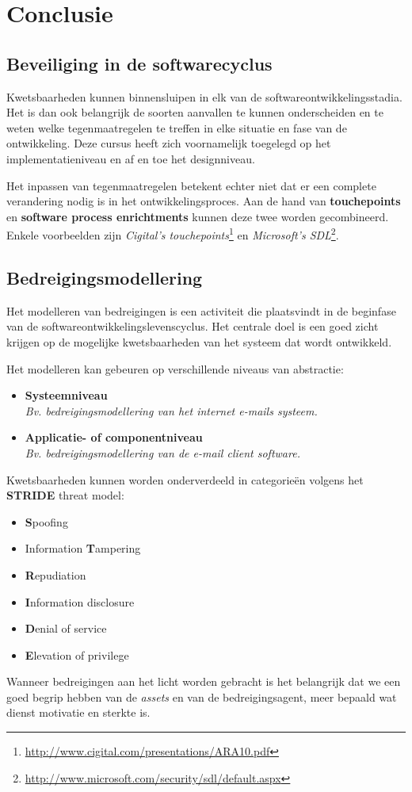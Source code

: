 \documentclass[../main.tex]{subfiles}
\begin{document}
\chapter{Conclusie}

\section{Beveiliging in de softwarecyclus}
Kwetsbaarheden kunnen binnensluipen in elk van de softwareontwikkelingsstadia.
Het is dan ook belangrijk de soorten aanvallen te kunnen onderscheiden en te weten welke tegenmaatregelen te treffen in elke situatie en fase van de ontwikkeling.
Deze cursus heeft zich voornamelijk toegelegd op het implementatieniveau en af en toe het designniveau.

Het inpassen van tegenmaatregelen betekent echter niet dat er een complete verandering nodig is in het ontwikkelingsproces.
Aan de hand van \textbf{touchepoints} en \textbf{software process enrichtments} kunnen deze twee worden gecombineerd.
Enkele voorbeelden zijn \textit{Cigital's touchepoints}\footnote{\url{http://www.cigital.com/presentations/ARA10.pdf}} en \textit{Microsoft's SDL}\footnote{\url{http://www.microsoft.com/security/sdl/default.aspx}}.

\section{Bedreigingsmodellering}
Het modelleren van bedreigingen is een activiteit die plaatsvindt in de beginfase van de softwareontwikkelingslevenscyclus. Het centrale doel is een goed zicht krijgen op de mogelijke kwetsbaarheden van het systeem dat wordt ontwikkeld. 

Het modelleren kan gebeuren op verschillende niveaus van abstractie:
\begin{itemize}
	\item \textbf{Systeemniveau} \\ \textit{Bv. bedreigingsmodellering van het internet e-mails systeem.}
	\item \textbf{Applicatie- of componentniveau} \\ \textit{Bv. bedreigingsmodellering van de e-mail client software.}
\end{itemize}
\noindent
Kwetsbaarheden kunnen worden onderverdeeld in categorie\"en volgens het \textbf{STRIDE} threat model:
\begin{itemize}
	\item \textbf{S}poofing
	\item Information \textbf{T}ampering
	\item \textbf{R}epudiation
	\item \textbf{I}nformation disclosure
	\item \textbf{D}enial of service
	\item \textbf{E}levation of privilege
\end{itemize}
Wanneer bedreigingen aan het licht worden gebracht is het belangrijk dat we een goed begrip hebben van de \textit{assets} en van de bedreigingsagent, meer bepaald wat dienst motivatie en sterkte is.
\end{document}
